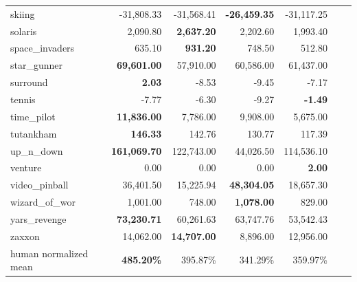 \begin{table}[h!t]
\begin{tabular}{l|rrrrr|r}
        skiing & -31,808.33 & -31,568.41 & \textbf{-26,459.35} & -31,117.25 \\ 
        solaris & 2,090.80 & \textbf{2,637.20} & 2,202.60 & 1,993.40 \\ 
        space\_invaders & 635.10 & \textbf{931.20} & 748.50 & 512.80 \\ 
        star\_gunner & \textbf{69,601.00} & 57,910.00 & 60,586.00 & 61,437.00 \\ 
        surround & \textbf{2.03} & -8.53 & -9.45 & -7.17 \\ 
        tennis & -7.77 & -6.30 & -9.27 & \textbf{-1.49} \\ 
        time\_pilot & \textbf{11,836.00} & 7,786.00 & 9,908.00 & 5,675.00 \\ 
        tutankham & \textbf{146.33} & 142.76 & 130.77 & 117.39 \\ 
        up\_n\_down & \textbf{161,069.70} & 122,743.00 & 44,026.50 & 114,536.10 \\ 
        venture & 0.00 & 0.00 & 0.00 & \textbf{2.00} \\ 
        video\_pinball & 36,401.50 & 15,225.94 & \textbf{48,304.05} & 18,657.30 \\ 
        wizard\_of\_wor & 1,001.00 & 748.00 & \textbf{1,078.00} & 829.00 \\ 
        yars\_revenge & \textbf{73,230.71} & 60,261.63 & 63,747.76 & 53,542.43 \\ 
        zaxxon & 14,062.00 & \textbf{14,707.00} & 8,896.00 & 12,956.00 \\ 
        \hline
        human normalized mean & \textbf{485.20\%} & 395.87\% & 341.29\% & 359.97\% \\
    \bottomrule
    \end{tabular}
    \label{tab:Atari57-score}
\end{table}